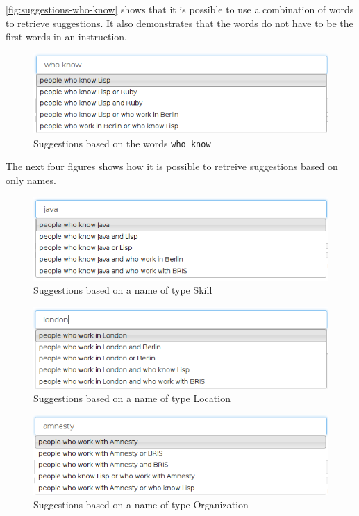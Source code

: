 \autoref{fig:suggestions-who-know} shows that it is possible to use a combination of words to retrieve suggestions. It also demonstrates that the words do not have to be the first words in an instruction.

\begin{figure}[H]
\includegraphics[scale=0.6,keepaspectratio,valign=t]{./gfx/who_know.png}
\caption{Suggestions based on the words \texttt{who know}\label{fig:suggestions-who-know}}
\end{figure}

The next four figures shows how it is possible to retreive suggestions based on only names.

\begin{figure}[H]
\includegraphics[scale=0.6,keepaspectratio,valign=t]{./gfx/java.png}
\caption{Suggestions based on a name of type Skill\label{fig:name-skill}}
\end{figure}

\begin{figure}[H]
\includegraphics[scale=0.6,keepaspectratio,valign=t]{./gfx/london.png}
\caption{Suggestions based on a name of type Location \label{fig:name-location}}
\end{figure}

\begin{figure}[H]
\includegraphics[scale=0.6,keepaspectratio,valign=t]{./gfx/amnesty.png}
\caption{Suggestions based on a name of type Organization\label{fig:name-organization}}
\end{figure}

